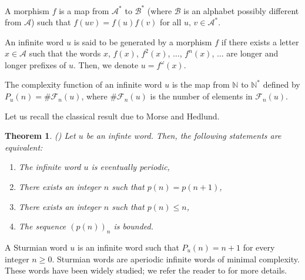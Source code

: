 \documentclass[a4 paper,12pt]{article}
\newtheorem{theorem}{Theorem}[section]
\begin{document}
A morphism $f$ is a map from $\mathcal{A}^{*}$ to $\mathcal{B}^{*}$ (where $\mathcal{B}$ is an alphabet possibly different from $\mathcal{A}$) such that $f(uv)=f(u)f(v)$ for all $u,\,v\in \mathcal{A}^{*}$.

An infinite word $u$ is said to be  generated by a morphism $f$ if there exists a letter $x\in \mathcal{A}$ such that the words $x$, $f(x)$, $f^2(x)$, $\ldots$, $f^n(x)$, $\ldots$ are longer and longer prefixes of $u$. Then, we denote   $u=f^{\omega}(x)$.

The complexity function of an infinite word $u$ is the map from $\mathbb{N}$ to $\mathbb{N}^{*}$ defined by $P_{u}( n)=\#\mathcal{F}_n(u)$, where $\#\mathcal{F}_n(u)$ is the number of elements in $\mathcal{F}_n(u)$.

Let us recall the classical result due to Morse and Hedlund.

\begin{theorem} (\cite{16}) \label{morse-hedlund} Let  $u$ be an infinte word. Then, the following statements are equivalent:
\begin{enumerate}

\item The infinite word $u$ is eventually periodic,

\item There  exists an integer  $n$ such that $p(n) =p(n+1)$,

\item There  exists an integer  $n$ such that  $p(n)\leq n$,

\item The sequence $(p(n))_n$ is bounded.

\end{enumerate}
\end{theorem}

A Sturmian word $u$ is an infinite word such that $P_{u}(n)=n+1$ for every integer $n\geq0$. Sturmian words are aperiodic infinite words of minimal complexity. These words have been widely studied; we refer the reader to \cite{15, 18} for more details.
\end{document}

